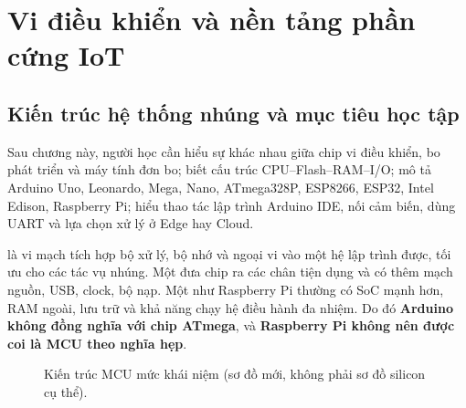 \chapter{Vi điều khiển và nền tảng phần cứng IoT}
\label{chap:mcu}

\section{Kiến trúc hệ thống nhúng và mục tiêu học tập}
Sau chương này, người học cần hiểu sự khác nhau giữa chip vi điều khiển, bo phát triển và máy tính đơn bo; biết cấu trúc CPU--Flash--RAM--I/O; mô tả Arduino Uno, Leonardo, Mega, Nano, ATmega328P, ESP8266, ESP32, Intel Edison, Raspberry Pi; hiểu thao tác lập trình Arduino IDE, nối cảm biến, dùng UART và lựa chọn xử lý ở Edge hay Cloud.

 là vi mạch tích hợp bộ xử lý, bộ nhớ và ngoại vi vào một hệ lập trình được, tối ưu cho các tác vụ nhúng. Một  đưa chip ra các chân tiện dụng và có thêm mạch nguồn, USB, clock, bộ nạp. Một  như Raspberry Pi thường có SoC mạnh hơn, RAM ngoài, lưu trữ và khả năng chạy hệ điều hành đa nhiệm. Do đó \textbf{Arduino không đồng nghĩa với chip ATmega}, và \textbf{Raspberry Pi không nên được coi là MCU theo nghĩa hẹp}.

\begin{figure}[htbp]\centering
{}
\caption{Kiến trúc MCU mức khái niệm (sơ đồ mới, không phải sơ đồ silicon cụ thể).}
\end{figure}

